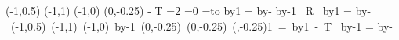 {{{                \oplput(-1,0.5){\op@subsymbol}%
              \else\ifx\op@voperator\op@string@top
                \oplput(-1,1){\op@subsymbol}%
              \else
                \oplput(-1,0){\op@subsymbol}%
              \fi\fi
              \ophline(0,-0.25){}%
              \kern-\op@count@v\opcolumnwidth
              \kern\op@count@iii\opcolumnwidth
                         {T\the\op@count@iv}%
            }%
          \else
            \ifnum{}=2
              \ifnum{}=0
                =\hbox to%
              \fi
            \fi
          \fi
          \advance\op@count@ii by1\relax
        \else
          \op@count@v=\op@count@i
          \advance\op@count@v by-%
          \relax\else
            \advance\op@count@v by-1
          \fi
          \hbox{%
            \kern\op@count@v\opcolumnwidth{}
                       {R\the\op@count@ii}%
          }%
          \advance\op@count@ii by1\relax
          \ifx\op@displayintermediary\op@string@none
          \else
            \op@count@iii=\op@count@i
            \advance\op@count@iii by-%
            \hbox{%
              \kern\op@count@v\opcolumnwidth
              \ifx\op@voperator\op@string@center
                \oplput(-1,0.5){\op@subsymbol}%
              \else\ifx\op@voperator\op@string@top
                \oplput(-1,1){\op@subsymbol}%
              \else
                \oplput(-1,0){\op@subsymbol}%
              \fi\fi
              \advance\op@count@ii by-1
              \relax
                \ophline(0,-0.25){}%
              \else
                \ophline(0,-0.25){}%
                \ophline(,-0.25){1}%
                {=}%
              \fi
              \advance\op@count@ii by1
              \kern-\op@count@v\opcolumnwidth
              \kern\op@count@iii\opcolumnwidth
                         {T\the\op@count@iv}%
            }%
          \fi
        \fi
      \repeat
      \advance\op@count@i by-1
      \op@count@iii=\op@count@i
      \advance\op@count@iii by-%
}}
